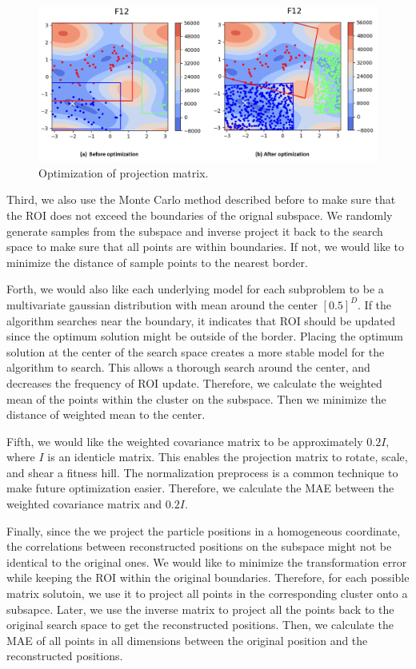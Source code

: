 \begin{figure}
\centering
\includegraphics[width=\textwidth]{Sample_projection}
\caption{Optimization of projection matrix.}\label{fig:Sample_projection}
\end{figure}

Third, we also use the Monte Carlo method described before to make sure that the ROI does not exceed the boundaries of the orignal subspace.
We randomly generate samples from the subspace and inverse project it back to the search space to make sure that all points are within boundaries.
If not, we would like to minimize the distance of sample points to the nearest border.

Forth, we would also like each underlying model for each subproblem 
to be a multivariate gaussian distribution with mean around the center $[0.5]^D$.
If the algorithm searches near the boundary, it indicates that ROI should be updated since the optimum solution might be outside of the border.
Placing the optimum solution at the center of the search space creates a more stable model for the algorithm to search.
This allows a thorough search around the center, and decreases the frequency of ROI update.
Therefore, we calculate the weighted mean of the points within the cluster on the subspace.
Then we minimize the distance of weighted mean to the center.  

Fifth, we would like the weighted covariance matrix to be approximately $0.2I$, where $I$ is an identicle matrix.
This enables the projection matrix to rotate, scale, and shear a fitness hill.
The normalization preprocess is a common technique to make future optimization easier.
Therefore, we calculate the MAE between the weighted covariance matrix and $0.2I$.  

Finally, since the we project the particle positions in a homogeneous coordinate,
the correlations between reconstructed positions on the subspace might not be identical to the original ones.
We would like to minimize the transformation error while keeping the ROI within the original boundaries.
Therefore, for each possible matrix solutoin, we use it to project all points in the corresponding cluster onto a subsapce.
Later, we use the inverse matrix to project all the points back to the original search space to get the reconstructed positions.
Then, we calculate the MAE of all points in all dimensions between the original position and the reconstructed positions.


